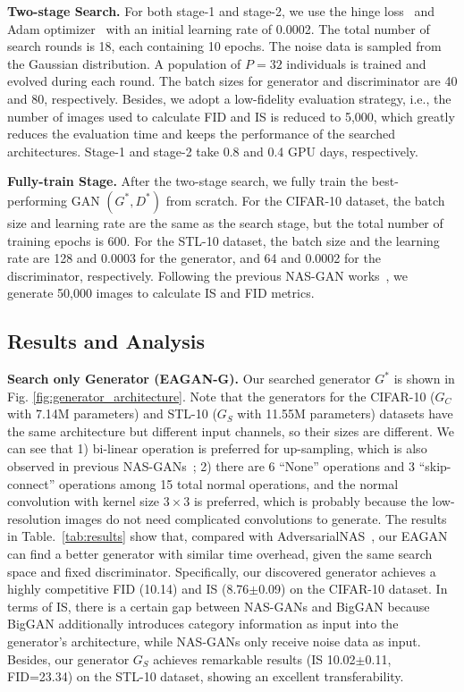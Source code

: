 \documentclass[runningheads]{llncs}
\begin{document}
\textbf{Two-stage Search.} For both stage-1 and stage-2, we use the hinge loss~\cite{SNGAN} and Adam optimizer~\cite{adam} with an initial learning rate of 0.0002. The total number of search rounds is 18, each containing 10 epochs. The noise data is sampled from the Gaussian distribution. A population of $P=32$ individuals is trained and evolved during each round. The batch sizes for generator and discriminator are 40 and 80, respectively. Besides, we adopt a low-fidelity evaluation strategy, i.e., the number of images used to calculate FID and IS is reduced to 5,000, which greatly reduces the evaluation time and keeps the performance of the searched architectures. Stage-1 and stage-2 take 0.8 and 0.4 GPU days, respectively.



\textbf{Fully-train Stage.} After the two-stage search, we fully train the best-performing GAN $(G^*,D^*)$ from scratch. For the CIFAR-10 dataset, the batch size and learning rate are the same as the search stage, but the total number of training epochs is 600. For the STL-10 dataset, the batch size and the learning rate are 128 and 0.0003 for the generator, and 64 and 0.0002 for the discriminator, respectively. Following the previous NAS-GAN works~\cite{Adversarialnas,autoGAN}, we generate 50,000 images to calculate IS and FID metrics.




\subsection{Results and Analysis}




\textbf{Search only Generator (EAGAN-G).} Our searched generator $G^*$ is shown in Fig. \ref{fig:generator_architecture}. Note that the generators for the CIFAR-10 ($G_C$ with 7.14M parameters) and STL-10 ($G_S$ with 11.55M parameters) datasets have the same architecture but different input channels, so their sizes are different. We can see that 1) bi-linear operation is preferred for up-sampling, which is also observed in previous NAS-GANs~\cite{Adversarialnas,offgan}; 2) there are 6 ``None'' operations and 3 ``skip-connect'' operations among 15 total normal operations, and the normal convolution with kernel size $3\times3$ is preferred, which is probably because the low-resolution images do not need complicated convolutions to generate. The results in Table.~\ref{tab:results} show that, compared with AdversarialNAS~\cite{Adversarialnas}, our EAGAN can find a better generator with similar time overhead, given the same search space and fixed discriminator. Specifically, our discovered generator achieves a highly competitive FID (10.14) and IS (8.76$\pm$0.09) on the CIFAR-10 dataset. In terms of IS, there is a certain gap between NAS-GANs and BigGAN \cite{biggan} because BigGAN additionally introduces category information as input into the generator's architecture, while NAS-GANs only receive noise data as input. Besides, our generator $G_S$ achieves remarkable results (IS 10.02$\pm$0.11, FID=23.34) on the STL-10 dataset, showing an excellent transferability.
\end{document}
